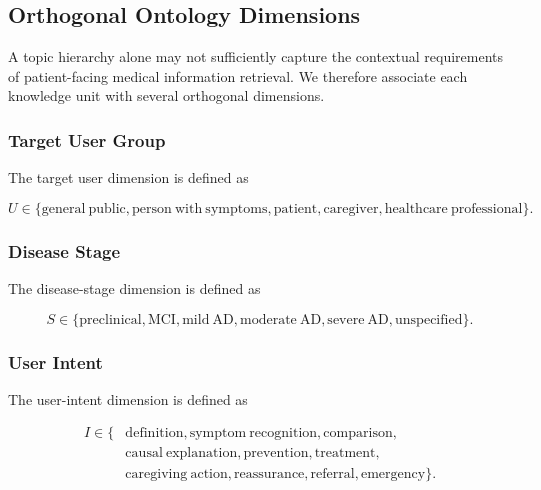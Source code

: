 \documentclass{article}
\begin{document}
\subsection{Orthogonal Ontology Dimensions}

A topic hierarchy alone may not sufficiently capture the contextual 
requirements of patient-facing medical information retrieval. We therefore 
associate each knowledge unit with several orthogonal dimensions.

\subsubsection{Target User Group}

The target user dimension is defined as

\begin{equation}
    U \in
    \{
    \mathrm{general\ public},
    \mathrm{person\ with\ symptoms},
    \mathrm{patient},
    \mathrm{caregiver},
    \mathrm{healthcare\ professional}
    \}.
\end{equation}

\subsubsection{Disease Stage}

The disease-stage dimension is defined as

\begin{equation}
    S \in
    \{
    \mathrm{preclinical},
    \mathrm{MCI},
    \mathrm{mild\ AD},
    \mathrm{moderate\ AD},
    \mathrm{severe\ AD},
    \mathrm{unspecified}
    \}.
\end{equation}

\subsubsection{User Intent}

The user-intent dimension is defined as

\begin{equation}
\begin{split}
    I \in \{&
    \mathrm{definition},
    \mathrm{symptom\ recognition},
    \mathrm{comparison},\\
    &\mathrm{causal\ explanation},
    \mathrm{prevention},
    \mathrm{treatment},\\
    &\mathrm{caregiving\ action},
    \mathrm{reassurance},
    \mathrm{referral},
    \mathrm{emergency}
    \}.
\end{split}
\end{equation}
\end{document}
